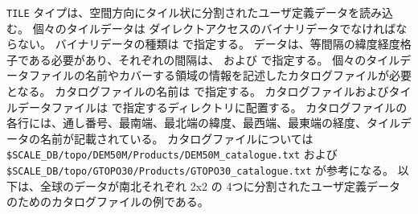 \verb|TILE| タイプは、空間方向にタイル状に分割されたユーザ定義データを読み込む。
個々のタイルデータは ダイレクトアクセスのバイナリデータでなければならない。
バイナリデータの種類は  で指定する。
データは、等間隔の緯度経度格子である必要があり、それぞれの間隔は、 および  で指定する。
個々のタイルデータファイルの名前やカバーする領域の情報を記述したカタログファイルが必要となる。
カタログファイルの名前は  で指定する。
カタログファイルおよびタイルデータファイルは  で指定するディレクトリに配置する。
カタログファイルの各行には、通し番号、最南端、最北端の緯度、最西端、最東端の経度、タイルデータの名前が記載されている。
カタログファイルについては \verb|$SCALE_DB/topo/DEM50M/Products/DEM50M_catalogue.txt| および \verb|$SCALE_DB/topo/GTOPO30/Products/GTOPO30_catalogue.txt| が参考になる。
以下は、全球のデータが南北それぞれ 2x2 の 4つに分割されたユーザ定義データのためのカタログファイルの例である。

